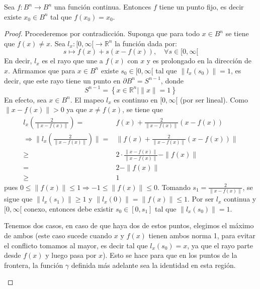 \documentclass[12pt]{report}
\theoremstyle{largebreak}
\newcommand\cf[3]{\ensuremath{#1:#2\rightarrow#3}}
\begin{document}
\setcounter{section}{6}
\setcounter{theor}{12}

\begin{theor}
    Sea $\cf{f}{B^n}{B^n}$ una función continua. Entonces $f$ tiene un punto fijo, es decir existe $x_0\in B^n$ tal que $f(x_0)=x_0$.
\end{theor}

\begin{proof}
    Procederemos por contradicción. Suponga que para todo $x\in B^n$ se tiene que $f(x)\neq x$. Sea $\cf{l_x}{[0,\infty[}{\mathbb{R}^n}$ la función dada por:
    \begin{equation*}
        s\mapsto f(x)+s\left(x-f(x)\right),\quad \forall s\in[0,\infty[
    \end{equation*}
    En decir, $l_x$ es el rayo que une a $f(x)$ con $x$ y es prolongado en la dirección de $x$. Afirmamos que para $x\in B^n$ existe $s_0\in[0,\infty[$ tal que $\|l_x(s_0)\|=1$, es decir, que este rayo tiene un punto en $\partial B^n=S^{n-1}$, donde
    \begin{equation*}
        S^{n-1}=\left\{x\in\mathbb{R}^n|\|x\|=1\right\}
    \end{equation*}
    En efecto, sea $x\in B^n$. El mapeo $l_x$ es continuo en $[0,\infty[$ (por ser lineal). Como $\|x-f(x)\|>0$ ya que $x\neq f(x)$, se tiene que
    \begin{equation*}
        \begin{split}
            l_x\left(\frac{2}{\|x-f(x)\|}\right)=&f(x)+\frac{2}{\|x-f(x)\|}\left(x-f(x)\right)\\
            \Rightarrow \|l_x\left(\frac{2}{\|x-f(x)\|}\right)\|=&\|f(x)+\frac{2}{\|x-f(x)\|}\left(x-f(x)\right)\|\\
            \geq& 2\cdot\frac{\|x-f(x)\|}{\|x-f(x)\|}-\|f(x)\|\\
            =&2-\|f(x)\|\\
            \geq&1
        \end{split}
    \end{equation*}
    pues $0\leq \|f(x)\|\leq 1 \Rightarrow -1\leq \|f(x)\|\leq 0$. Tomando $s_1=\frac{2}{\|x-f(x)\|}$, se sigue que $\|l_x(s_1)\|\geq 1$ y $\|l_x(0)\|=\|f(x)\|\leq 1$. Por ser $l_x$ continua y $[0,\infty[$ conexo, entonces debe existir $s_0\in[0,s_1]$ tal que $\|l_x(s_0)\|=1$.

    \begin{obs}
        Tenemos dos casos, en caso de que haya dos de estos puntos, elegimos el máximo de ambos (este caso sucede cuando $x$ y $f(x)$ tienen ambos norma 1, para evitar el conflicto tomamos al mayor, es decir tal que $l_x(s_0)=x$, ya que el rayo parte desde $f(x)$ y luego pasa por $x$). Esto se hace para que en los puntos de la frontera, la función $\gamma$ definida más adelante sea la identidad en esta región. 


\end{obs}
\end{proof}
\end{document}
